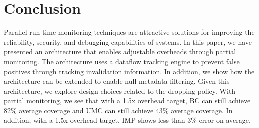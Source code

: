 \section{Conclusion}
\label{sec:conclusion}

Parallel run-time monitoring techniques are attractive solutions for improving
the reliability, security, and debugging capabilities of systems. In this
paper, we have presented an architecture that enables adjustable overheads through partial monitoring. 
The architecture uses a dataflow tracking engine to prevent false positives
through tracking invalidation information. In addition, we show how the
architecture can be extended to enable null metadata filtering.
Given this architecture, we explore design choices related to the dropping policy.
With partial monitoring, we see that with a 1.5x overhead target, BC can still
achieve 82\% average coverage and UMC can still achieve 43\% average coverage.
In addition, with a 1.5x overhead target, IMP shows less than 3\% error on
average.


